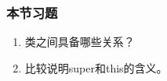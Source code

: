 \begin{frame}[fragile] %
  \frametitle{本节习题}

  \begin{enumerate}
  \item 类之间具备哪些关系？
  \item 比较说明super和this的含义。
  \end{enumerate}
\end{frame}



